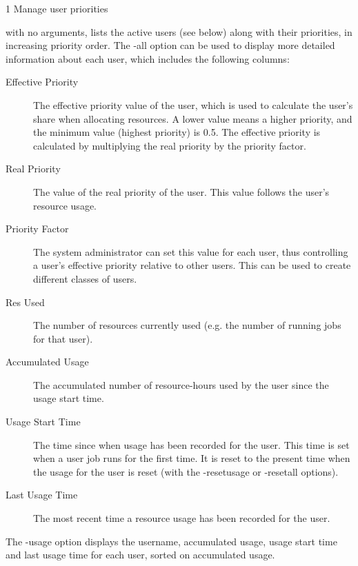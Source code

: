 \begin{ManPage}{\label{man-condor-userprio}}{1}
{Manage user priorities} 
\Synopsis {}


\Description 
{} with no arguments, lists the active users (see below) along with their
priorities, in increasing priority order. The -all option can be used to display
more detailed information about each user, which includes the following columns:

\begin{description}
\item[Effective Priority] The effective priority value of the user, which is used to
calculate the user's share when allocating resources. A lower value means a higher
priority, and the minimum value (highest priority) is 0.5. The effective priority is
calculated by multiplying the real priority by the priority factor.
\item[Real Priority] The value of the real priority of the user. This value follows the
user's resource usage.
\item[Priority Factor] The system administrator can set this value for each user, thus 
controlling a user's effective priority relative to other users. This can be used to
create different classes of users.
\item[Res Used] The number of resources currently used (e.g. the number of running jobs
for that user).
\item[Accumulated Usage] The accumulated number of resource-hours used by the user since
the usage start time.
\item[Usage Start Time] The time since when usage has been recorded for the user. This time
is set when a user job runs for the first time. It is reset to the present time when the
usage for the user is reset (with the -resetusage or -resetall options).
\item[Last Usage Time] The most recent time a resource usage has been recorded for the user.
\end{description}

The -usage option displays the username, accumulated usage, usage start time and last usage time
for each user, sorted on accumulated usage.


\end{ManPage}
